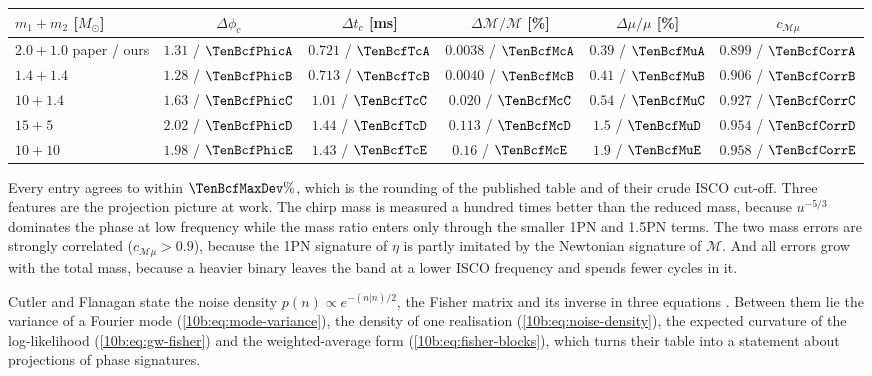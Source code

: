 \begin{center}
\footnotesize
\setlength{\tabcolsep}{4pt}
\begin{tabular}{@{}lccccc@{}}
\toprule
$m_1+m_2$ [$M_\odot$] & $\Delta\phi_c$ & $\Delta t_c$ [ms] & $\Delta\mathcal M/\mathcal M$ [\%] & $\Delta\mu/\mu$ [\%] & $c_{\mathcal M\mu}$\\\midrule
$2.0+1.0$ paper / ours & $1.31$ / $\TenBcfPhicA$ & $0.721$ / $\TenBcfTcA$ & $0.0038$ / $\TenBcfMcA$ & $0.39$ / $\TenBcfMuA$ & $0.899$ / $\TenBcfCorrA$\\
$1.4+1.4$ & $1.28$ / $\TenBcfPhicB$ & $0.713$ / $\TenBcfTcB$ & $0.0040$ / $\TenBcfMcB$ & $0.41$ / $\TenBcfMuB$ & $0.906$ / $\TenBcfCorrB$\\
$10+1.4$ & $1.63$ / $\TenBcfPhicC$ & $1.01$ / $\TenBcfTcC$ & $0.020$ / $\TenBcfMcC$ & $0.54$ / $\TenBcfMuC$ & $0.927$ / $\TenBcfCorrC$\\
$15+5$ & $2.02$ / $\TenBcfPhicD$ & $1.44$ / $\TenBcfTcD$ & $0.113$ / $\TenBcfMcD$ & $1.5$ / $\TenBcfMuD$ & $0.954$ / $\TenBcfCorrD$\\
$10+10$ & $1.98$ / $\TenBcfPhicE$ & $1.43$ / $\TenBcfTcE$ & $0.16$ / $\TenBcfMcE$ & $1.9$ / $\TenBcfMuE$ & $0.958$ / $\TenBcfCorrE$\\
\bottomrule
\end{tabular}
\end{center}

\noindent Every entry agrees to within $\TenBcfMaxDev\%$, which is the rounding of the published table and of
their crude ISCO cut-off. Three features are the projection picture at work. The chirp mass is measured a hundred
times better than the reduced mass, because $u^{-5/3}$ dominates the phase at low frequency while the mass ratio
enters only through the smaller 1PN and 1.5PN terms. The two mass errors are strongly correlated
($c_{\mathcal M\mu}>0.9$), because the 1PN signature of $\eta$ is partly imitated by the Newtonian signature of
$\mathcal M$. And all errors grow with the total mass, because a heavier binary leaves the band at a lower ISCO
frequency and spends fewer cycles in it.

Cutler and Flanagan state the noise density $p(n)\propto e^{-(n|n)/2}$, the Fisher matrix and its inverse in three
equations \cite[Sec.~II B]{CutlerFlanagan1994}. Between them lie the variance of a Fourier mode
(\cref{10b:eq:mode-variance}), the density of one realisation (\cref{10b:eq:noise-density}), the expected curvature of
the log-likelihood (\cref{10b:eq:gw-fisher}) and the weighted-average form
(\cref{10b:eq:fisher-blocks}), which turns their table into a statement about projections of phase signatures.

